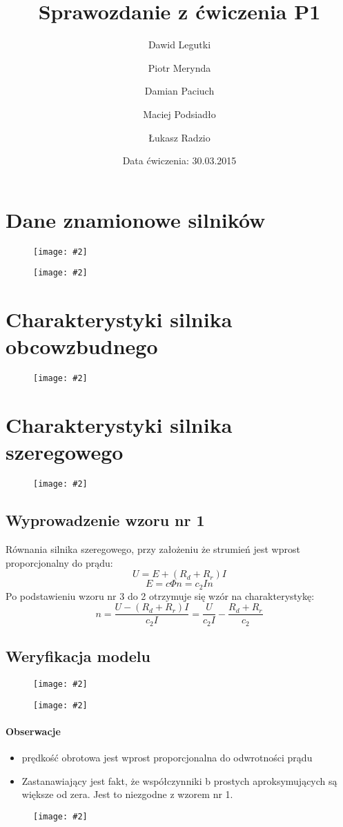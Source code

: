 \documentclass[12pt]{article}
\title{Sprawozdanie z ćwiczenia P1}
\author{ 
Dawid Legutki \and Piotr Merynda \and Damian Paciuch \and Maciej Podsiadło \and Łukasz Radzio}
\date{Data ćwiczenia: 30.03.2015}
\newcommand{\obrazek}[2]
{
	\begin{figure}[H]
	\centering
	\texttt{[image: \#2]}
	\end{figure}
}
\begin{document}
\maketitle

\section{Dane znamionowe silników}
	\obrazek{6}{tabele/DZ_obcowzbudny}
	\obrazek{6}{tabele/DZ_szeregowy}
\section{Charakterystyki silnika obcowzbudnego}

	\obrazek{12}{wykresy/Obcowzbudny}
	
	
\section{Charakterystyki silnika szeregowego}

	\obrazek{12}{wykresy/Szeregowy}
	
	
	
	\subsection{Wyprowadzenie wzoru nr 1}
	Równania silnika szeregowego, przy założeniu że strumień jest wprost proporcjonalny do prądu:
	\begin{equation}
	U=E+(R_d+R_r)I
	\end{equation}
	\begin{equation}
	E=c\Phi n=c_2 In
	\end{equation}
	Po podstawieniu wzoru nr 3 do 2 otrzymuje się wzór na charakterystykę:
	\begin{equation}
	n=\frac{U-(R_d+R_r)I}{c_2 I}=\frac{U}{c_2 I} - \frac{R_d+R_r}{c_2}
	\end{equation}
	\subsection{Weryfikacja modelu}
	\obrazek{12}{wykresy/U150Rd0}
	\obrazek{12}{wykresy/U120Rd0}
	\paragraph{Obserwacje}
		\begin{itemize}
			\item prędkość obrotowa jest wprost proporcjonalna do odwrotności prądu
			\item Zastanawiający jest fakt, że współczynniki b prostych aproksymujących są większe od zera. Jest to niezgodne z wzorem nr 1.
		\end{itemize}
	\obrazek{12}{wykresy/U150Rd1}
\end{document}
